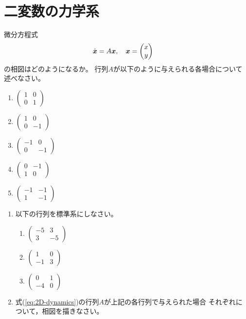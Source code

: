 \documentclass[twocolumn,11pt]{jarticle}
\begin{document}
\section{二変数の力学系}
\nquestion
微分方程式
\begin{align}
\dot{\boldsymbol{x}}&=A\boldsymbol{x},\quad
\boldsymbol{x}=
\begin{pmatrix}
x\\y  
\end{pmatrix}\label{eq:2D-dynamics}
\end{align}
の相図はどのようになるか。
 行列$A$が以下のように与えられる各場合について述べなさい。
 \begin{enumerate}
 \item $
   \begin{pmatrix}
     1 & 0\\
     0 & 1
   \end{pmatrix}$
 \item $
   \begin{pmatrix}
     1 & 0\\
     0 & -1
   \end{pmatrix}$
 \item $
   \begin{pmatrix}
     -1 & 0\\
     0 & -1
   \end{pmatrix}$
 \item $
   \begin{pmatrix}
     0 & -1 \\
     1 & 0
   \end{pmatrix}$
 \item $
   \begin{pmatrix}
     -1 & -1 \\
     1 & -1
   \end{pmatrix}$
 \end{enumerate}

\nquestion
\begin{enumerate}
\item 
以下の行列を標準系にしなさい。
\begin{enumerate}
\item $
  \begin{pmatrix}
    -5 & 3 \\
    3 & -5
  \end{pmatrix}
$%
\item 
$
  \begin{pmatrix}
    1 & 0 \\
    -1 & 3
  \end{pmatrix}
$%
\item $
  \begin{pmatrix}
    0 & 1 \\
    -4 & 0
  \end{pmatrix}
$%
\end{enumerate}
\item 式(\ref{eq:2D-dynamics})の行列$A$が上記の各行列で与えられた場合
  それぞれについて，相図を描きなさい。
\end{enumerate}
\end{document}
